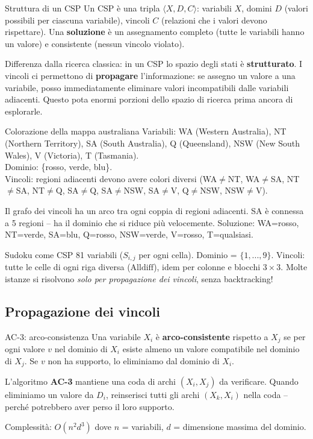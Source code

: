 \documentclass[12pt,a4paper]{article}
\begin{document}
\begin{narrativo}{Struttura di un CSP}
Un CSP è una tripla $\langle X, D, C \rangle$: variabili $X$, domini $D$ (valori possibili per ciascuna variabile), vincoli $C$ (relazioni che i valori devono rispettare). Una \textbf{soluzione} è un assegnamento completo (tutte le variabili hanno un valore) e consistente (nessun vincolo violato).

Differenza dalla ricerca classica: in un CSP lo spazio degli stati è \textbf{strutturato}. I vincoli ci permettono di \textbf{propagare} l'informazione: se assegno un valore a una variabile, posso immediatamente eliminare valori incompatibili dalle variabili adiacenti. Questo pota enormi porzioni dello spazio di ricerca prima ancora di esplorarle.
\end{narrativo}

\begin{esempio}{Colorazione della mappa australiana}
Variabili: WA (Western Australia), NT (Northern Territory), SA (South Australia), Q (Queensland), NSW (New South Wales), V (Victoria), T (Tasmania).\\
Dominio: \{rosso, verde, blu\}.\\
Vincoli: regioni adiacenti devono avere colori diversi (WA$\neq$NT, WA$\neq$SA, NT$\neq$SA, NT$\neq$Q, SA$\neq$Q, SA$\neq$NSW, SA$\neq$V, Q$\neq$NSW, NSW$\neq$V).

Il grafo dei vincoli ha un arco tra ogni coppia di regioni adiacenti. SA è connessa a 5 regioni -- ha il dominio che si riduce più velocemente. Soluzione: WA=rosso, NT=verde, SA=blu, Q=rosso, NSW=verde, V=rosso, T=qualsiasi.
\end{esempio}

\begin{esempio}{Sudoku come CSP}
81 variabili ($S_{i,j}$ per ogni cella). Dominio = $\{1,...,9\}$. Vincoli: tutte le celle di ogni riga diversa ($\text{Alldiff}$), idem per colonne e blocchi $3\times3$. Molte istanze si risolvono \emph{solo per propagazione dei vincoli}, senza backtracking!
\end{esempio}

\subsection{Propagazione dei vincoli}

\begin{narrativo}{AC-3: arco-consistenza}
Una variabile $X_i$ è \textbf{arco-consistente} rispetto a $X_j$ se per ogni valore $v$ nel dominio di $X_i$ esiste almeno un valore compatibile nel dominio di $X_j$. Se $v$ non ha supporto, lo eliminiamo dal dominio di $X_i$.

L'algoritmo \textbf{AC-3} mantiene una coda di archi $(X_i, X_j)$ da verificare. Quando eliminiamo un valore da $D_i$, reinserisci tutti gli archi $(X_k, X_i)$ nella coda -- perché potrebbero aver perso il loro supporto.

Complessità: $O(n^2 d^3)$ dove $n$ = variabili, $d$ = dimensione massima del dominio.
\end{narrativo}
\end{document}
